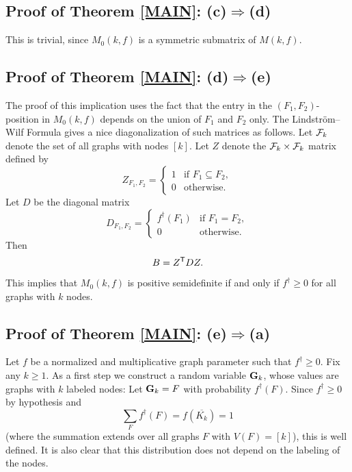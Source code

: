 \documentclass[fleqn]{article}
\begin{document}
\subsection{Proof of Theorem \ref{MAIN}: (c)$\Rightarrow$(d)}

This is trivial, since $M_0(k,f)$ is a symmetric submatrix of
$M(k,f)$.

\subsection{Proof of Theorem \ref{MAIN}: (d)$\Rightarrow$(e)}

The proof of this implication uses the fact that the entry in the
$(F_1,F_2)$-position in $M_0(k,f)$ depends on the union of $F_1$ and
$F_2$ only. The Lindstr\"om--Wilf Formula gives a nice
diagonalization of such matrices  as follows. Let ${\cal F}_k$ denote the
set of all graphs with nodes $[k]$. Let $Z$ denote the
${\cal F}_k\times{\cal F}_k$ matrix defined by
\begin{equation}\label{LWZ}
Z_{F_1,F_2}=
  \begin{cases}
    1 & \text{if $F_1\subseteq F_2$}, \\
    0 & \text{otherwise}.
  \end{cases}
\end{equation}
Let $D$ be the diagonal matrix
\begin{equation}\label{LWD}
D_{F_1,F_2}=
  \begin{cases}
    f^\dagger(F_1) & \text{if $F_1=F_2$}, \\
    0 & \text{otherwise}.
  \end{cases}
\end{equation}
Then
\begin{equation}\label{LWMAIN}
B=Z^{\sf T} D Z.
\end{equation}
This implies that $M_0(k,f)$ is positive semidefinite if and only
if $f^{\dagger}\ge 0$ for all graphs with $k$ nodes.

\subsection{Proof of Theorem \ref{MAIN}: (e)$\Rightarrow$(a)}

Let $f$ be a normalized and multiplicative graph parameter such that
$f^{\dagger}\ge 0$. Fix any $k\ge 1$. As a first step we construct a
random variable ${\mathbf G}_k$, whose values are graphs with $k$ labeled
nodes: Let ${\mathbf G}_k=F$ with probability $f^{\dagger}(F)$. Since
$f^\dagger\ge 0$ by hypothesis and
\[
\sum_F f^{\dagger}(F) = f(\overline{K_k})=1
\]
(where the summation extends over all graphs $F$ with $V(F)=[k]$),
this is well defined. It is also clear that this distribution does
not depend on the labeling of the nodes.
\end{document}
